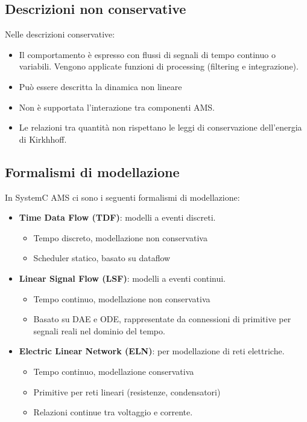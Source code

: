 \documentclass[a4paper]{article}
\theoremstyle{definition}
\begin{document}
		\subsection{Descrizioni non conservative}
		Nelle descrizioni conservative:
		\begin{itemize}
			\item Il comportamento è espresso con flussi di segnali di tempo continuo o variabili. Vengono applicate funzioni di processing (filtering e integrazione).
			\item Può essere descritta la dinamica non lineare
			\item Non è supportata l'interazione tra componenti AMS.
			\item Le relazioni tra quantità non rispettano le leggi di conservazione dell'energia di Kirkhhoff.
		\end{itemize}
		
		
		\subsection{Formalismi di modellazione}
			In SystemC AMS ci sono i seguenti formalismi di modellazione:
			\begin{itemize}
				\item \textbf{Time Data Flow (TDF)}: modelli a eventi discreti.
				\begin{itemize}
					\item Tempo discreto, modellazione non conservativa
					\item Scheduler statico, basato su dataflow
				\end{itemize}
				\item \textbf{Linear Signal Flow (LSF)}: modelli a eventi continui.
				\begin{itemize}
					\item Tempo continuo, modellazione non conservativa
					\item Basato su DAE e ODE, rappresentate da connessioni di primitive per segnali reali nel dominio del tempo.
				\end{itemize}
				\item \textbf{Electric Linear Network (ELN)}: per modellazione di reti elettriche.
				\begin{itemize}
					\item Tempo continuo, modellazione conservativa
					\item Primitive per reti lineari (resistenze, condensatori)
					\item Relazioni continue tra voltaggio e corrente.
				\end{itemize}
			\end{itemize}
			
\end{document}
